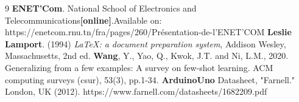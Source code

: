 \adjustmtc
\renewcommand\bibname{BIBLIOGRAPHY}
\begin{thebibliography}{9}
\thispagestyle{MyStyle}
\textbf{ENET'Com}. National School of Electronics and Telecommunications\textbf{[online]}.Available on: https://enetcom.rnu.tn/fra/pages/260/Présentation-de-l’ENET’COM
\textbf{ Leslie Lamport}. (1994) \emph{\LaTeX: a document preparation system}, Addison
Wesley, Massachusetts, 2nd ed.
\textbf{Wang}, Y., Yao, Q., Kwok, J.T. and Ni, L.M., 2020. Generalizing from a few examples: A survey on few-shot learning. ACM computing surveys (csur), 53(3), pp.1-34.
\textbf{ArduinoUno} Datasheet, "Farnell." London, UK (2012).
https://www.farnell.com/datasheets/1682209.pdf
\end{thebibliography} 

